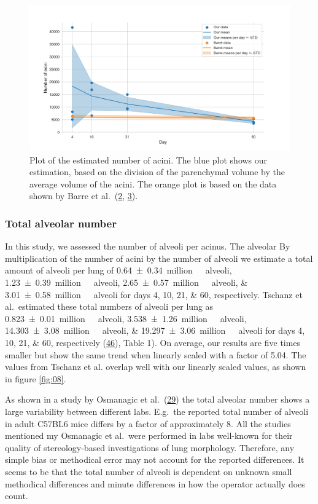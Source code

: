 \documentclass[
  american,
]{article}
\begin{document}
\begin{figure}
\hypertarget{fig:07}{%
\centering
\includegraphics{images/fig07.png}
\caption{Plot of the estimated number of acini.
The blue plot shows our estimation, based on the division of the parenchymal volume by the average volume of the acini.
The orange plot is based on the data shown by Barre et al.~(\protect\hyperlink{ref-14OP85b2F}{2}, \protect\hyperlink{ref-uFNlWogb}{3}).}\label{fig:07}
}
\end{figure}

\hypertarget{total-alveolar-number}{%
\subsubsection{Total alveolar number}\label{total-alveolar-number}}

In this study, we assessed the number of alveoli per acinus. The alveolar By multiplication of the number of acini by the number of alveoli we estimate a total amount of alveoli per lung of \SIlist{0.64 +- 0.34; 1.23 +- 0.39; 2.65 +-  0.57; 3.01 +- 0.58}{million\  alveoli} for days 4, 10, 21, \& 60, respectively.
Tschanz et al.~estimated these total numbers of alveoli per lung as \SIlist{0.823 +- 0.01; 3.538 +- 1.26; 14.303 +- 3.08; 19.297 +- 3.06}{million\ alveoli} for days 4, 10, 21, \& 60, respectively (\protect\hyperlink{ref-wnl86DEM}{46}), Table 1).
On average, our results are five times smaller but show the same trend when linearly scaled with a factor of 5.04.
The values from Tschanz et al.
overlap well with our linearly scaled values, as shown in figure \ref{fig:08}.

As shown in a study by Osmanagic et al.~(\protect\hyperlink{ref-LzalnLBH}{29}) the total alveolar number shows a large variability between different labs.
E.g.~the reported total number of alveoli in adult C57BL6 mice differs by a factor of approximately 8.
All the studies mentioned my Osmanagic et al.~were performed in labs well-known for their quality of stereology-based investigations of lung morphology.
Therefore, any simple bias or methodical error may not account for the reported differences.
It seems to be that the total number of alveoli is dependent on unknown small methodical differences and minute differences in how the operator actually does count.
\end{document}
